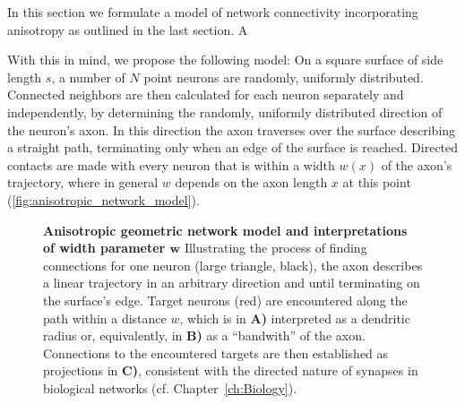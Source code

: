 





In this section we formulate a model of network connectivity
incorporating anisotropy as outlined in the last section. A 

With this in mind, we propose the following model: On a square surface
of side length $s$, a number of $N$ point neurons are randomly,
uniformly distributed.  Connected neighbors are then calculated for
each neuron separately and independently, by determining the randomly,
uniformly distributed direction of the neuron's axon. In this
direction the axon traverses over the surface describing a straight
path, terminating only when an edge of the surface is
reached. Directed contacts are made with every neuron that is within a
width $w(x)$ of the axon's trajectory, where in general $w$ depends on
the axon length $x$ at this point
(\autoref{fig:anisotropic_network_model}).

\begin{figure}[!htbp]
  \centering 
    \caption{%
      \textbf{Anisotropic geometric network model and interpretations
        of width parameter $\boldsymbol w$} Illustrating the process of
      finding connections for one neuron (large triangle, black), the
      axon describes a linear trajectory in an arbitrary direction and
      until terminating on the surface's edge. Target neurons (red)
      are encountered along the path within a distance $w$, which is in
      \textbf{A)} interpreted as a dendritic radius or, equivalently,
      in \textbf{B)} as a \enquote{bandwith} of the axon. Connections
      to the encountered targets are then established as projections
      in \textbf{C)}, consistent with the directed nature of synapses
      in biological networks (cf. Chapter~\ref{ch:Biology}).}
  \label{fig:anisotropic_network_model}
\end{figure}

